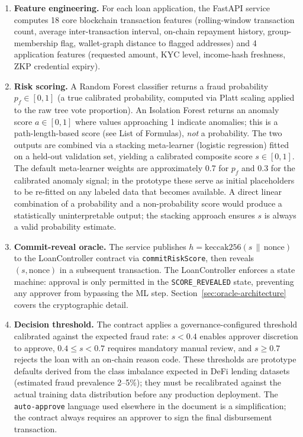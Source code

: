 \documentclass[12pt,a4paper]{report}
\begin{document}
\begin{enumerate}[noitemsep]
\item \textbf{Feature engineering.} For each loan application, the FastAPI service computes 18 core blockchain transaction features (rolling-window transaction count, average inter-transaction interval, on-chain repayment history, group-membership flag, wallet-graph distance to flagged addresses) and 4 application features (requested amount, KYC level, income-hash freshness, ZKP credential expiry).
\item \textbf{Risk scoring.} A Random Forest classifier returns a fraud probability $p_f \in [0,1]$ (a true calibrated probability, computed via Platt scaling applied to the raw tree vote proportion). An Isolation Forest returns an anomaly score $a \in [0,1]$ where values approaching 1 indicate anomalies; this is a path-length-based score (see List of Formulas), \textit{not} a probability. The two outputs are combined via a stacking meta-learner (logistic regression) fitted on a held-out validation set, yielding a calibrated composite score $s \in [0,1]$. The default meta-learner weights are approximately 0.7 for $p_f$ and 0.3 for the calibrated anomaly signal; in the prototype these serve as initial placeholders to be re-fitted on any labeled data that becomes available. A direct linear combination of a probability and a non-probability score would produce a statistically uninterpretable output; the stacking approach ensures $s$ is always a valid probability estimate.
\item \textbf{Commit-reveal oracle.} The service publishes \(h = \mathrm{keccak256}(s \,\|\, \text{nonce})\) to the LoanController contract via \texttt{commitRiskScore}, then reveals $(s, \text{nonce})$ in a subsequent transaction. The LoanController enforces a state machine: approval is only permitted in the \texttt{SCORE\_REVEALED} state, preventing any approver from bypassing the ML step. Section~\ref{sec:oracle-architecture} covers the cryptographic detail.
\item \textbf{Decision threshold.} The contract applies a governance-configured threshold calibrated against the expected fraud rate: $s < 0.4$ enables approver discretion to approve, $0.4 \le s < 0.7$ requires mandatory manual review, and $s \ge 0.7$ rejects the loan with an on-chain reason code. These thresholds are prototype defaults derived from the class imbalance expected in DeFi lending datasets (estimated fraud prevalence 2--5\%); they must be recalibrated against the actual training data distribution before any production deployment. The \texttt{auto-approve} language used elsewhere in the document is a simplification; the contract always requires an approver to sign the final disbursement transaction.
\end{enumerate}
\end{document}
